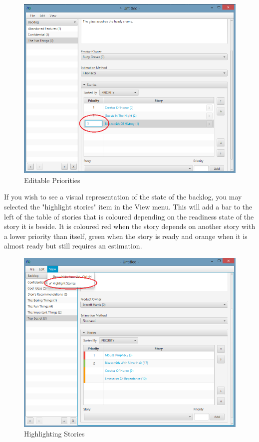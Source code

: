\begin{figure}[H]
\centering
\includegraphics[width=\textwidth]{images/screenshots/editable_priority.PNG}
\caption{Editable Priorities}
\label{fig:new_project}
\end{figure}

\newline
If you wish to see a visual representation of the state of the backlog, you may selected the "highlight stories" item in the View menu. This will add a bar to the left of the table of stories that is coloured depending on the readiness state of the story it is beside. It is coloured red when the story depends on another story with a lower priority than itself, green when the story is ready and orange when it is almost ready but still requires an estimation.

\begin{figure}[H]
\centering
\includegraphics[width=\textwidth]{images/screenshots/story_highlighting.PNG}
\caption{Highlighting Stories}
\label{fig:new_project}
\end{figure}

